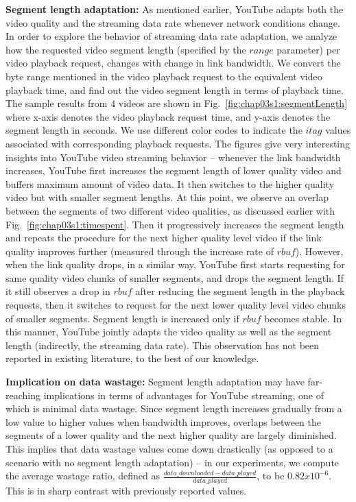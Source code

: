 {\bf Segment length adaptation:} As mentioned earlier, YouTube adapts both the video quality and the streaming data rate whenever network conditions change.
In order to explore the behavior of streaming data rate adaptation, we analyze how the requested video segment length (specified by the $range$ parameter) per video playback request, changes with change in link bandwidth.
We convert the byte range mentioned in the video playback request to the equivalent video playback time, and find out the video segment length in terms of playback time.
The sample results from $4$ videos are shown in Fig.~\ref{fig:chap03s1:segmentLength} where x-axis denotes the video playback request time, and y-axis denotes the segment length in seconds.
We use different color codes to indicate the $itag$ values associated with corresponding playback requests.
The figures give very interesting insights into YouTube video streaming behavior -- whenever the link bandwidth increases, YouTube first increases the segment length of lower quality video and buffers maximum amount of video data.
It then switches to the higher quality video but with smaller segment lengths.
At this point, we observe an overlap between the segments of two different video qualities, as discussed earlier with Fig.~\ref{fig:chap03s1:timespent}.
Then it progressively increases the segment length and repeats the procedure for the next higher quality level video if the link quality improves further (measured through the increase rate of $rbuf$).
However, when the link quality drops, in a similar way, YouTube first starts requesting for same quality video chunks of smaller segments, and drops the segment length.
If it still observes a drop in $rbuf$ after reducing the segment length in the playback requests, then it switches to request for the next lower quality level video chunks of smaller segments.
Segment length is increased only if $rbuf$ becomes stable.
In this manner, YouTube jointly adapts the video quality as well as the segment length (indirectly, the streaming data rate).
This observation has not been reported in existing literature, to the best of our knowledge.

{\bf Implication on data wastage:} Segment length adaptation may have far-reaching implications in terms of advantages for YouTube streaming, one of which is minimal data wastage.
Since segment length increases gradually from a low value to higher values when bandwidth improves, overlaps between the segments of a lower quality and the next higher quality are largely diminished.
This implies that data wastage values come down drastically (as opposed to a scenario with no segment length adaptation) -- in our experiments, we compute the average wastage ratio, defined as $\frac{data\_downloaded - data\_played}{data\_played}$, to be $0.82 x 10^{-6}$.
This is in sharp contrast with previously reported values. 

